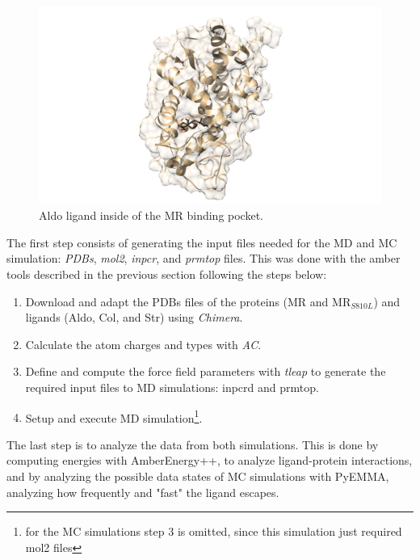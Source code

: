 \documentclass[
  journal=usp, %
  manuscript=final-report,
  year=2023,
  volume=1,
]{cup-journal}
\begin{document}

\begin{figure}[htbp]
\centering
\includegraphics[width=0.9\linewidth]{Images/MR-AS4_escene.png}
\caption{Aldo ligand inside of the MR binding pocket.}
\label{as4_scence}
\end{figure}

The first step consists of generating the input files needed for the MD and MC simulation: \textit{PDBs}, \textit{mol2}, \textit{inpcr}, and \textit{prmtop} files. This was done with the amber tools described in the previous section following the steps below:

\begin{enumerate}
    \item Download and adapt the PDBs files of the proteins (MR and MR$_{S810L}$) and ligands (Aldo, Col, and Str) using \textit{Chimera}. 
    \item Calculate the atom charges and types with \textit{AC}.
    \item Define and compute the force field parameters with \textit{tleap} to generate the required input files to MD simulations: inpcrd and prmtop.
    \item Setup and execute MD simulation\footnote{for the MC simulations step 3 is omitted, since this simulation just required mol2 files}.
\end{enumerate}

The last step is to analyze the data from both simulations. This is done by computing energies with AmberEnergy++, to analyze ligand-protein interactions, and by analyzing the possible data states of MC simulations with PyEMMA, analyzing how frequently and "fast" the ligand escapes.
\end{document}
